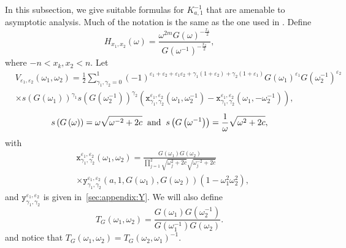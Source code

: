 \documentclass[11pt,twoside]{amsart}
\theoremstyle{plain}
\numberwithin{quest}{section}
\theoremstyle{remark}
\numberwithin{rem}{section}
\theoremstyle{definition}
\newcommand{\eps}{\varepsilon}
\begin{document}
	In this subsection, we give suitable formulas for $K^{-1}_{a,1}$ that are amenable to asymptotic analysis.  Much of the notation is the same as the one used in \cite{CJ16}. Define
	\begin{equation} \label{eq:prev:H}
		{ H_{x_1,x_2}(\omega)}=\frac{\omega^{2m}  G \left(\omega \right)^{-\frac{x_1}{2}}}{G \left(\omega^{-1} \right)^{-\frac{x_2}{2}}},
	\end{equation}
	where $-n < x_k,x_2 < n$. 
	Let
	\begin{equation} \label{eq:prev:V}
		\begin{split}
			& V_{\eps_1,\eps_2}(\omega_1, \omega_2)=\frac{1}{2}\sum_{\gamma_1,\gamma_2=0}^1  (-1)^{\eps_1 +\eps_2 +\eps_1 \eps_2+ \gamma_1 (1+\eps_2) +\gamma_2(1+\eps_1) }
			G\left( \omega_1 \right) ^{\eps_1}G\left( \omega_2^{-1}  \right)^{\eps_2}  \\
			& \times s\left( G\left( \omega_1 \right)\right)^{\gamma_1}   s \left( G\left( \omega_2^{-1} \right)\right)^{\gamma_2}
			\left(
			\mathtt{x}^{\eps_1, \eps_2}_{\gamma_1,\gamma_2} \left(  \omega_1 , \omega_2^{-1}   \right)
			- \mathtt{x}^{ \eps_1, \eps_2}_{\gamma_1,\gamma_2} \left(  \omega_1 ,- \omega_2^{-1}   \right) \right),
		\end{split}
	\end{equation}
	\begin{equation} \label{eq:prev:s}
		s \left( G\left( \omega \right)\right)=\omega \sqrt{\omega^{-2}+2c} \hspace{2mm} \mbox{and} \hspace{2mm}
		s \left( G\left( \omega^{-1} \right)\right)=\frac{1}{\omega} \sqrt{\omega^{2}+2c},
	\end{equation}
	with 
	\begin{equation}\label{eq:prev:x}
		\begin{split}
			&\mathtt{x}^{\eps_1,\eps_2}_{\gamma_1,\gamma_2} \left(  \omega_1 , \omega_2   \right) =   \frac{ G\left( \omega_1 \right)G\left( \omega_2 \right)}{\prod_{j=1}^2 \sqrt{ \omega_j^2+2c} \sqrt{ \omega_j^{-2}+2c} }\\
			&\times \mathtt{y}_{\gamma_1,\gamma_2}^{\eps_1,\eps_2} \left( a,1, G\left( \omega_1 \right),G\left( \omega_2 \right)  \right) \left( 1- \omega_1^2 \omega_2^2 \right),
		\end{split}
	\end{equation}
	and $\mathtt{y}_{\gamma_1,\gamma_2}^{\eps_1,\eps_2}$ is given in~\cref{sec:appendix:Y}.  
	We will also define
	\begin{equation}\label{eq:T_G}
	T_G(\omega_1,\omega_2)=\frac{G(\omega_1)G(\omega_2^{-1})}{G(\omega_1^{-1})G(\omega_2)}.
	\end{equation}
	and notice that $T_G(\omega_1,\omega_2)=T_G(\omega_2,\omega_1)^{-1}$.
	
\end{document}
